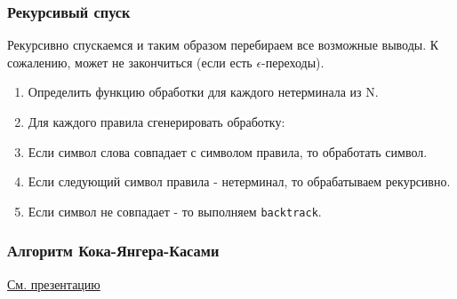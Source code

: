 \subsubsection{Рекурсивый спуск}
Рекурсивно спускаемся и таким образом перебираем все возможные выводы. К сожалению, может не закончиться (если есть \(\epsilon\)-переходы).

\begin{enumerate}
    \item Определить функцию обработки для каждого нетерминала из N.
    \item Для каждого правила сгенерировать обработку:
    \item Если символ слова совпадает с символом правила, то обработать символ.
    \item Если следующий символ правила - нетерминал, то обрабатываем рекурсивно.
    \item Если символ не совпадает - то выполняем \texttt{backtrack}.
\end{enumerate}

\subsubsection{Алгоритм Кока-Янгера-Касами}
\href{https://t.me/c/3021064992/17}{См. презентацию}
